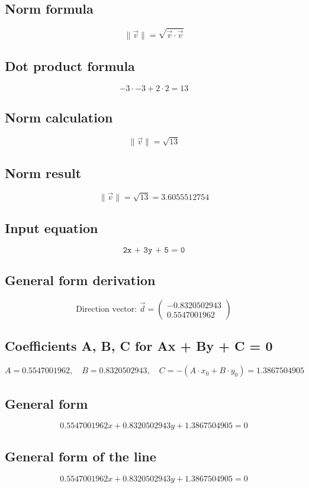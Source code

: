 \documentclass{article}
\begin{document}
\subsection*{ \vspace{1em} Norm formula}
\[
\|\vec{v}\| = \sqrt{\vec{v} \cdot \vec{v}}
\]
\subsection*{ \vspace{1em} Dot product formula}
\[
-3 \cdot -3 + 2 \cdot 2 = 13
\]
\subsection*{ \vspace{1em} Norm calculation}
\[
\|\vec{v}\| = \sqrt{13}
\]
\subsection*{ \vspace{1em} Norm result}
\[
\|\vec{v}\| = \sqrt{13} = 3.6055512754
\]
\subsection*{ \vspace{1em} Input equation}
\[
\texttt{2x + 3y + 5 = 0}
\]
\subsection*{ \vspace{1em} General form derivation}
\[
\text{Direction vector: } \vec{d} = \begin{pmatrix}-0.8320502943 \\ 0.5547001962\end{pmatrix}
\]
\subsection*{ \vspace{1em} Coefficients A, B, C for Ax + By + C = 0}
\[
A = 0.5547001962,\quad B = 0.8320502943,\quad C = - (A \cdot x_0 + B \cdot y_0) = 1.3867504905
\]
\subsection*{ \vspace{1em} General form}
\[
0.5547001962x + 0.8320502943y + 1.3867504905 = 0
\]
\subsection*{ \vspace{1em} General form of the line}
\[
0.5547001962x + 0.8320502943y + 1.3867504905 = 0
\]
\end{document}
